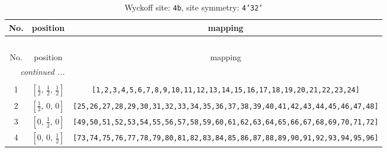 \documentclass[fleqn,8pt]{jsarticle}
\begin{document}
\begin{longtable}{ccc}
\caption{Wyckoff site: {\tt 4b}, site symmetry: {\tt 4'32'}}
 \\
 \hline \hline
No. & position & mapping \\ \hline \endfirsthead

\multicolumn{2}{l}{\tablename\ \thetable{}} \\
 \hline \hline
No. & position & mapping \\ \hline \endhead

 \hline \hline
\multicolumn{2}{r}{\footnotesize\it continued ...} \\ \endfoot

 \hline \hline
\multicolumn{2}{r}{} \\ \endlastfoot

1 & $\left[ \frac{1}{2},\, \frac{1}{2},\, \frac{1}{2} \right]$ & {\tt [1,2,3,4,5,6,7,8,9,10,11,12,13,14,15,16,17,18,19,20,21,22,23,24]} \\ \hline
2 & $\left[ \frac{1}{2},\, 0,\, 0 \right]$ & {\tt [25,26,27,28,29,30,31,32,33,34,35,36,37,38,39,40,41,42,43,44,45,46,47,48]} \\ \hline
3 & $\left[ 0,\, \frac{1}{2},\, 0 \right]$ & {\tt [49,50,51,52,53,54,55,56,57,58,59,60,61,62,63,64,65,66,67,68,69,70,71,72]} \\ \hline
4 & $\left[ 0,\, 0,\, \frac{1}{2} \right]$ & {\tt [73,74,75,76,77,78,79,80,81,82,83,84,85,86,87,88,89,90,91,92,93,94,95,96]} \\
\end{longtable}
\renewcommand{\arraystretch}{1.2}
\end{document}
